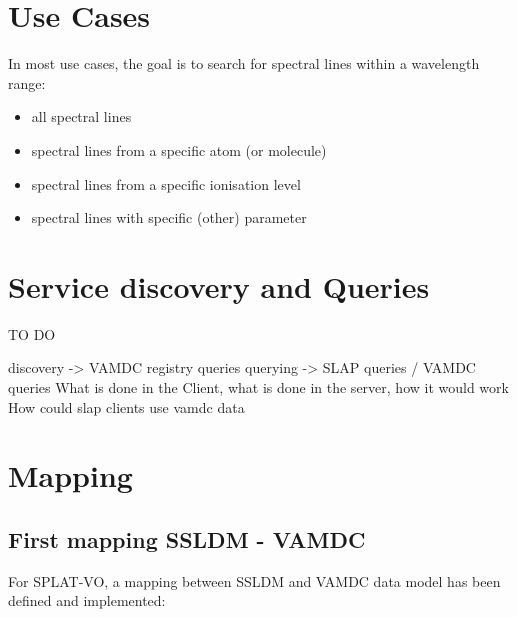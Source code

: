 \documentclass[11pt,a4paper]{ivoa}
\begin{document}
\section{Use Cases}

In most use cases, the goal is to search for spectral lines within a wavelength range:

\begin{itemize}
\item all spectral lines 
\item spectral lines from a specific atom (or molecule)
\item spectral lines from a specific ionisation level
\item spectral lines with specific (other) parameter

\end{itemize}

\section{Service discovery and Queries}
TO DO

discovery -> VAMDC registry queries
querying ->  SLAP queries / VAMDC queries
What is done in the Client, what is done in the server, how it would work
How could slap clients use vamdc data

\section{Mapping}

\subsection{First mapping SSLDM - VAMDC}
For SPLAT-VO, a mapping between SSLDM and VAMDC data model has been defined and implemented:
\end{document}
